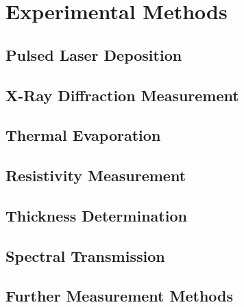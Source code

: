 \chapter{Experimental Methods}
\minitoc

\section{Pulsed Laser Deposition}
    

\section{X-Ray Diffraction Measurement}
    


\section{Thermal Evaporation}
    
\section{Resistivity Measurement}
    
        \label{Sec:Methods_vanDerPauw}
\section{Thickness Determination}
    
\section{Spectral Transmission}
    
        \label{Sec:Methods_transmission}
\section{Further Measurement Methods}
    